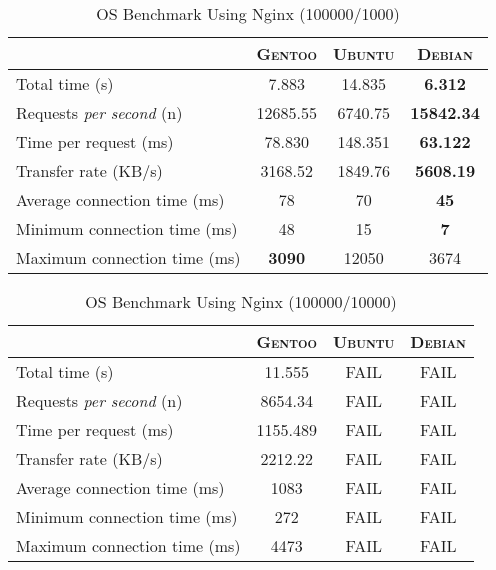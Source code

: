 \begin{table}[h!t]
  \centering
  \caption{OS Benchmark Using Nginx (100000/1000)}
  \label{tab:os_nginx_100000_1000}
  
  \begin{tabular}{l|c|c|c}

    & \textbf{\textsc{Gentoo}} & \textbf{\textsc{Ubuntu}} & \textbf{\textsc{Debian}} \\ \hline
    Total time (s) & 7.883 & 14.835 & \textbf{6.312} \\ \hline
    Requests \textit{per second} (n) & 12685.55 & 6740.75 & \textbf{15842.34} \\ \hline
    Time per request (ms) & 78.830 & 148.351 & \textbf{63.122} \\ \hline
    Transfer rate (KB/s) & 3168.52 & 1849.76 & \textbf{5608.19} \\ \hline
    Average connection time (ms) & 78 & 70 & \textbf{45} \\ \hline
    Minimum connection time (ms) & 48 & 15 & \textbf{7} \\ \hline
    Maximum connection time (ms) & \textbf{3090} & 12050 & 3674 \\
  \end{tabular}
\end{table}

\begin{table}[h!t]
  \centering
  \caption{OS Benchmark Using Nginx (100000/10000)}
  \label{tab:os_nginx_100000_10000}
  
  \begin{tabular}{l|c|c|c}

    & \textbf{\textsc{Gentoo}} & \textbf{\textsc{Ubuntu}} & \textbf{\textsc{Debian}} \\ \hline
    Total time (s) & 11.555 & FAIL & FAIL \\ \hline
    Requests \textit{per second} (n) & 8654.34 & FAIL & FAIL \\ \hline
    Time per request (ms) & 1155.489 & FAIL & FAIL \\ \hline
    Transfer rate (KB/s) & 2212.22 & FAIL & FAIL \\ \hline
    Average connection time (ms) & 1083 & FAIL & FAIL \\ \hline
    Minimum connection time (ms) & 272 & FAIL & FAIL \\ \hline
    Maximum connection time (ms) & 4473 & FAIL & FAIL \\
  \end{tabular}
\end{table}

